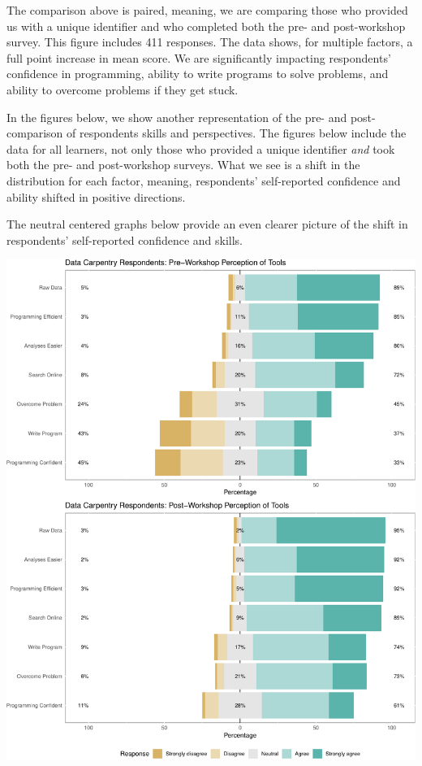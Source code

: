 \documentclass[]{article}
\makeatletter
\def\maxwidth{\ifdim\Gin@nat@width>\linewidth\linewidth\else\Gin@nat@width\fi}
\makeatother
\begin{document}
The comparison above is paired, meaning, we are comparing those who
provided us with a unique identifier and who completed both the pre- and
post-workshop survey. This figure includes 411 responses. The data
shows, for multiple factors, a full point increase in mean score. We are
significantly impacting respondents' confidence in programming, ability
to write programs to solve problems, and ability to overcome problems if
they get stuck.

In the figures below, we show another representation of the pre- and
post-comparison of respondents skills and perspectives. The figures
below include the data for all learners, not only those who provided a
unique identifier \emph{and} took both the pre- and post-workshop
surveys. What we see is a shift in the distribution for each factor,
meaning, respondents' self-reported confidence and ability shifted in
positive directions.

The neutral centered graphs below provide an even clearer picture of the
shift in respondents' self-reported confidence and skills.

\includegraphics[width=\maxwidth]{../figures/dc-tools-perception-1}
\end{document}
